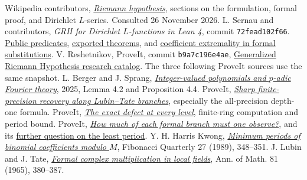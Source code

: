 \documentclass[11pt,letterpaper]{article}
\newcommand{\pinned}[2]{\href{https://github.com/VladimirReshetnikov/ProveIt/blob/b9a7c196e4aed3d93d4f222efef677a50efe912b/Analysis/GeneralizedRiemannHypothesis/#1}{#2}}
\newcommand{\upstream}[2]{\href{https://github.com/lsernau/grh-lean/blob/72fead102f663d5c7a407964a13dc0cf9d977207/grh/#1}{#2}}
\begin{document}
\begin{thebibliography}{9}\small
{} Wikipedia contributors, \href{https://en.wikipedia.org/wiki/Riemann_hypothesis}{\emph{Riemann hypothesis}}, sections on the formulation, formal proof, and Dirichlet $L$-series. Consulted 26 November 2026.
 L. Sernau and contributors, \emph{GRH for Dirichlet $L$-functions in Lean 4}, commit \texttt{72fead102f66}. \upstream{src/Statements.lean}{Public predicates}, \upstream{src/Main.lean}{exported theorems}, and \upstream{src/New/Derivatives/Sharpness/OneCurve.lean}{coefficient extremality in formal substitutions}.
 V. Reshetnikov, ProveIt, commit \texttt{b9a7c196e4ae}, \pinned{README.md}{Generalized Riemann Hypothesis research catalog}. The three following ProveIt sources use the same snapshot.
 L. Berger and J. Sprang, \href{https://arxiv.org/abs/2502.18053v2}{\emph{Integer-valued polynomials and $p$-adic Fourier theory}}, 2025, Lemma 4.2 and Proposition 4.4.
 ProveIt, \pinned{Research/grh_method_transfers_orthogonal_jets_2026-11-26/sections/jets.tex}{\emph{Sharp finite-precision recovery along Lubin--Tate branches}}, especially the all-precision depth-one formula.
 ProveIt, \pinned{Research/grh_prime_patterns_and_branch_precision/periodicity.tex}{\emph{The exact defect at every level}}, finite-ring computation and period bound.
 ProveIt, \pinned{Research/grh_transfers_lubin_tate_and_graph_towers/branches.tex}{\emph{How much of each formal branch must one observe?}}, and its \pinned{Research/grh_transfers_lubin_tate_and_graph_towers/discussion.tex}{further question on the least period}.
 Y. H. Harris Kwong, \href{https://doi.org/10.1080/00150517.1989.12429549}{\emph{Minimum periods of binomial coefficients modulo $M$}}, Fibonacci Quarterly 27 (1989), 348--351.
 J. Lubin and J. Tate, \href{https://doi.org/10.2307/1970622}{\emph{Formal complex multiplication in local fields}}, Ann. of Math. 81 (1965), 380--387.
\end{thebibliography}
\end{document}
